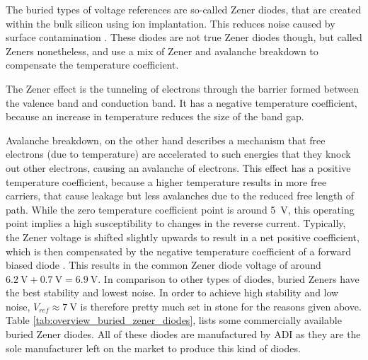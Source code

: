 The buried types of voltage references are so-called Zener diodes, that are created within the bulk silicon using ion implantation. This reduces noise caused by surface contamination \cite{zener_diode_stability}. These diodes are not true Zener diodes though, but called Zeners nonetheless, and use a mix of Zener and avalanche breakdown to compensate the temperature coefficient.

The Zener effect is the tunneling of electrons through the barrier formed between the valence band and conduction band. It has a negative temperature coefficient, because an increase in temperature reduces the size of the band gap.

Avalanche breakdown, on the other hand describes a mechanism that free electrons (due to temperature) are accelerated to such energies that they knock out other electrons, causing an avalanche of electrons. This effect has a positive temperature coefficient, because a higher temperature results in more free carriers, that cause leakage but less avalanches due to the reduced free length of path. While the zero temperature coefficient point is around \qty{5}{\V}, this operating point implies a high susceptibility to changes in the reverse current. Typically, the Zener voltage is shifted slightly upwards to result in a net positive coefficient, which is then compensated by the negative temperature coefficient of a forward biased diode \cite{zener_diode_stability}. This results in the common Zener diode voltage of around $\qty{6.2}{\V} + \qty{0.7}{\V} = \qty{6.9}{\V}$. In comparison to other types of diodes, buried Zeners have the best stability and lowest noise. In order to achieve high stability and low noise, $V_{ref} \approx \qty{7}{\V}$ is therefore pretty much set in stone for the reasons given above. Table \ref{tab:overview_buried_zener_diodes}, lists some commercially available buried Zener diodes. All of these diodes are manufactured by ADI as they are the sole manufacturer left on the market to produce this kind of diodes.

